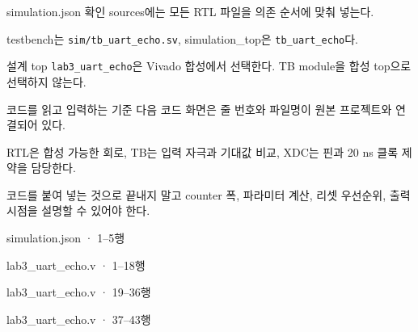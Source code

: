 \begin{frame}{simulation.json 확인}
\small
sources에는 모든 RTL 파일을 의존 순서에 맞춰 넣는다.\par\vspace{0.25cm}
testbench는 \texttt{sim/tb\_uart\_echo.sv}, simulation\_top은 \texttt{tb\_uart\_echo}다.\par\vspace{0.25cm}
설계 top \texttt{lab3\_uart\_echo}은 Vivado 합성에서 선택한다. TB module을 합성 top으로 선택하지 않는다.
\end{frame}

\begin{frame}[label=code]{코드를 읽고 입력하는 기준}
\small
다음 코드 화면은 줄 번호와 파일명이 원본 프로젝트와 연결되어 있다.\par\vspace{0.25cm}
RTL은 합성 가능한 회로, TB는 입력 자극과 기대값 비교, XDC는 핀과 20 ns 클록 제약을 담당한다.\par\vspace{0.25cm}
코드를 붙여 넣는 것으로 끝내지 말고 counter 폭, 파라미터 계산, 리셋 우선순위, 출력 시점을 설명할 수 있어야 한다.
\end{frame}

\begin{frame}[fragile]{simulation.json · 1–5행}

\end{frame}

\begin{frame}[fragile]{lab3\_uart\_echo.v · 1–18행}

\end{frame}

\begin{frame}[fragile]{lab3\_uart\_echo.v · 19–36행}

\end{frame}

\begin{frame}[fragile]{lab3\_uart\_echo.v · 37–43행}

\end{frame}

